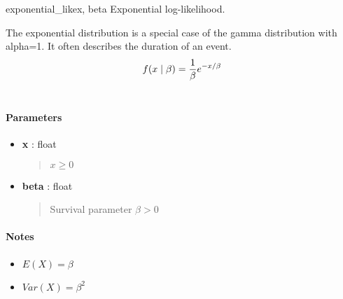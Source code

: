 \hypertarget{pymc.distributions.exponential_like}{}\begin{funcdesc}{exponential\_like}{x, beta}
Exponential log-likelihood.

The exponential distribution is a special case of the gamma distribution
with alpha=1. It often describes the duration of an event.
\begin{gather}
\begin{split}f(x \mid \beta) = \frac{1}{\beta}e^{-x/\beta}\end{split}\notag\\\begin{split}\end{split}\notag
\end{gather}
\paragraph{Parameters}
\begin{itemize}
\item[] \textbf{x} : float
\begin{quote}

$x \ge 0$
\end{quote}

\item[] \textbf{beta} : float
\begin{quote}

Survival parameter $\beta > 0$
\end{quote}
\end{itemize}
\paragraph{Notes}
\begin{itemize}
\item {} 
$E(X) = \beta$

\item {} 
$Var(X) = \beta^2$

\end{itemize}
\end{funcdesc}

